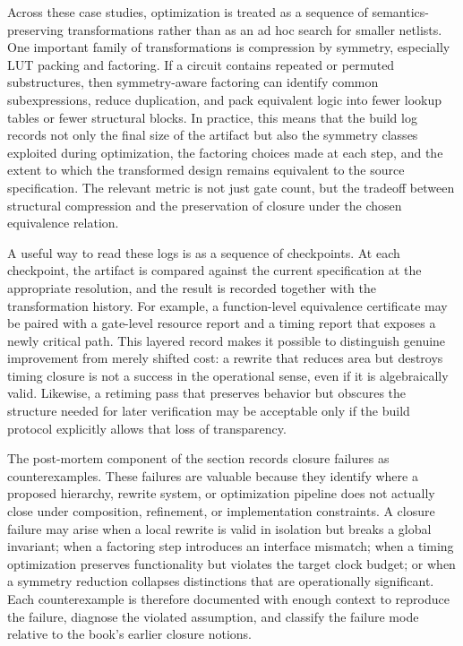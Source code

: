 Across these case studies, optimization is treated as a sequence of semantics-preserving transformations rather than as an ad hoc search for smaller netlists. One important family of transformations is compression by symmetry, especially LUT packing and factoring. If a circuit contains repeated or permuted substructures, then symmetry-aware factoring can identify common subexpressions, reduce duplication, and pack equivalent logic into fewer lookup tables or fewer structural blocks. In practice, this means that the build log records not only the final size of the artifact but also the symmetry classes exploited during optimization, the factoring choices made at each step, and the extent to which the transformed design remains equivalent to the source specification. The relevant metric is not just gate count, but the tradeoff between structural compression and the preservation of closure under the chosen equivalence relation.

A useful way to read these logs is as a sequence of checkpoints. At each checkpoint, the artifact is compared against the current specification at the appropriate resolution, and the result is recorded together with the transformation history. For example, a function-level equivalence certificate may be paired with a gate-level resource report and a timing report that exposes a newly critical path. This layered record makes it possible to distinguish genuine improvement from merely shifted cost: a rewrite that reduces area but destroys timing closure is not a success in the operational sense, even if it is algebraically valid. Likewise, a retiming pass that preserves behavior but obscures the structure needed for later verification may be acceptable only if the build protocol explicitly allows that loss of transparency.

The post-mortem component of the section records closure failures as counterexamples. These failures are valuable because they identify where a proposed hierarchy, rewrite system, or optimization pipeline does not actually close under composition, refinement, or implementation constraints. A closure failure may arise when a local rewrite is valid in isolation but breaks a global invariant; when a factoring step introduces an interface mismatch; when a timing optimization preserves functionality but violates the target clock budget; or when a symmetry reduction collapses distinctions that are operationally significant. Each counterexample is therefore documented with enough context to reproduce the failure, diagnose the violated assumption, and classify the failure mode relative to the book's earlier closure notions.

